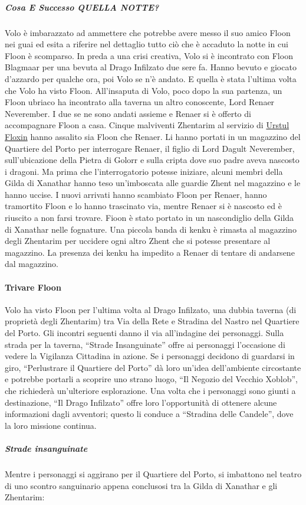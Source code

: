 \documentclass{article}
\begin{document}
\subparagraph{Cosa E Successo QUELLA NOTTE?} Volo è imbarazzato ad ammettere che potrebbe avere
messo il suo amico Floon nei guai ed esita a riferire nel
dettaglio tutto ciò che è accaduto la notte in cui Floon è
scomparso. In preda a una crisi creativa, Volo si è incontrato con
Floon Blagmaar per una bevuta al Drago Infilzato due sere
fa. Hanno bevuto e giocato d'azzardo per qualche ora, poi
Volo se n'è andato. E quella è stata l'ultima volta che Volo
ha visto Floon.
All’insaputa di Volo, poco dopo la sua partenza, un Floon
ubriaco ha incontrato alla taverna un altro conoscente,
Lord Renaer Neverember. I due se ne sono andati assieme
e Renaer si è offerto di accompagnare Floon a casa. Cinque
malviventi Zhentarim al servizio di \hyperlink{urstul}{Urstul Floxin}  hanno assalito sia Floon che Renaer. Li
hanno portati in un magazzino del Quartiere del Porto per
interrogare Renaer, il figlio di Lord Dagult Neverember,
sull’ubicazione della Pietra di Golorr e sulla cripta dove suo
padre aveva nascosto i dragoni. Ma prima che l'interrogatorio
potesse iniziare, alcuni membri della Gilda di Xanathar
hanno teso un'imboscata alle guardie Zhent nel magazzino e
le hanno uccise. I nuovi arrivati hanno scambiato Floon per
Renaer, hanno tramortito Floon e lo hanno trascinato via,
mentre Renaer si è nascosto ed è riuscito a non farsi trovare.
Fioon è stato portato in un nascondiglio della Gilda di
Xanathar nelle fognature. Una piccola banda di kenku è
rimasta al magazzino degli Zhentarim per uccidere ogni
altro Zhent che si potesse presentare al magazzino. La
presenza dei kenku ha impedito a Renaer di tentare di
andarsene dal magazzino.
\paragraph{Trivare Floon}Volo ha visto Floon per l'ultima volta al Drago Infilzato, una dubbia taverna (di proprietà degli Zhentarim) tra Via della Rete e Stradina del Nastro nel Quartiere del Porto. Gli incontri seguenti danno il via all'indagine dei personaggi. 
Sulla strada per la taverna, “Strade Insanguinate” offre ai personaggi l'occasione di vedere la Vigilanza Cittadina in azione. Se i personaggi decidono di guardarsi in giro, “Perlustrare il Quartiere del Porto” dà loro un'idea dell'ambiente circostante e potrebbe portarli a scoprire uno strano luogo, “Il Negozio del Vecchio Xoblob”, che richiederà un'ulteriore esplorazione. Una volta che i personaggi sono giunti a destinazione, “Il Drago Infilzato” offre loro l'opportunità di ottenere alcune informazioni dagli avventori; questo li conduce a “Stradina delle Candele”, dove la loro missione continua.
\subparagraph{Strade insanguinate}
 Mentre i personaggi si aggirano per il Quartiere del Porto, si imbattono nel teatro di uno scontro sanguinario appena conclusosi tra la Gilda di Xanathar e gli Zhentarim: \newline
\end{document}
